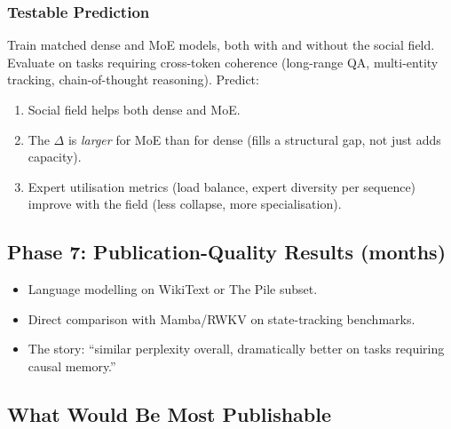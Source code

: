 \documentclass[11pt,a4paper]{article}
\begin{document}
\subsubsection{Testable Prediction}

Train matched dense and MoE models, both with and without the social
field.  Evaluate on tasks requiring cross-token coherence (long-range
QA, multi-entity tracking, chain-of-thought reasoning).  Predict:
\begin{enumerate}
    \item Social field helps both dense and MoE.
    \item The $\Delta$ is \emph{larger} for MoE than for dense
          (fills a structural gap, not just adds capacity).
    \item Expert utilisation metrics (load balance, expert diversity
          per sequence) improve with the field (less collapse, more
          specialisation).
\end{enumerate}


\subsection{Phase 7: Publication-Quality Results (months)}

\begin{itemize}
    \item Language modelling on WikiText or The Pile subset.
    \item Direct comparison with Mamba/RWKV on state-tracking
          benchmarks.
    \item The story: ``similar perplexity overall, dramatically
          better on tasks requiring causal memory.''
\end{itemize}

\subsection{What Would Be Most Publishable}
\end{document}
